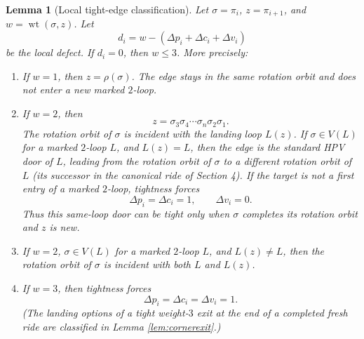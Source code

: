 \documentclass[11pt]{article}
\newtheorem{lemma}[theorem]{Lemma}
\DeclareMathOperator{\wt}{wt}
\begin{document}
\begin{lemma}[Local tight-edge classification]\label{lem:localtight}
Let \(\sigma=\pi_i\), \(z=\pi_{i+1}\), and \(w=\wt(\sigma,z)\).  Let
\[
  d_i=w-(\Delta p_i+\Delta c_i+\Delta v_i)
\]
be the local defect.  If \(d_i=0\), then \(w\le 3\).  More precisely:

\begin{enumerate}
\item If \(w=1\), then \(z=\rho(\sigma)\).  The edge stays in the same rotation orbit and
does not enter a new marked \(2\)-loop.
\item If \(w=2\), then
\[
  z=\sigma_3\sigma_4\cdots\sigma_n\sigma_2\sigma_1.
\]
The rotation orbit of \(\sigma\) is incident with the landing loop \(L(z)\).  If
\(\sigma\in V(L)\) for a marked \(2\)-loop \(L\), and \(L(z)=L\), then the edge is the standard
HPV door of \(L\), leading from the rotation orbit of \(\sigma\) to a different rotation orbit
of \(L\) (its successor in the canonical ride of Section 4).  If the target is not a first entry of a marked
\(2\)-loop, tightness forces
\[
  \Delta p_i=\Delta c_i=1,\qquad \Delta v_i=0.
\]
Thus this same-loop door can be tight only when \(\sigma\) completes its rotation orbit and
\(z\) is new.
\item If \(w=2\), \(\sigma\in V(L)\) for a marked \(2\)-loop \(L\), and \(L(z)\ne L\), then the rotation orbit of
\(\sigma\) is incident with both \(L\) and \(L(z)\).
\item If \(w=3\), then tightness forces
\[
  \Delta p_i=\Delta c_i=\Delta v_i=1.
\]
(The landing options of a tight weight-\(3\) exit at the end of a completed fresh ride are
classified in Lemma \ref{lem:cornerexit}.)
\end{enumerate}
\end{lemma}
\end{document}
